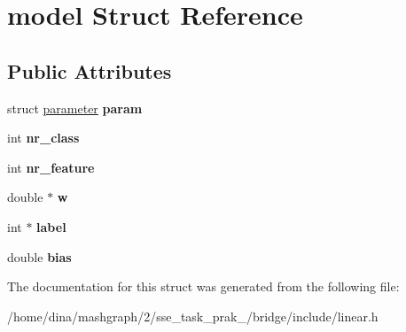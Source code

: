 \hypertarget{structmodel}{\section{model Struct Reference}
\label{structmodel}
}
\subsection*{Public Attributes}
\begin{DoxyCompactItemize}
\item 
\hypertarget{structmodel_a3ca6778799fcb1f51768582e3c0c31cd}{struct \hyperlink{structparameter}{parameter} {\bfseries param}}\label{structmodel_a3ca6778799fcb1f51768582e3c0c31cd}

\item 
\hypertarget{structmodel_a357cb97b0fc81dbbffe5e3f76841f58d}{int {\bfseries nr\-\_\-class}}\label{structmodel_a357cb97b0fc81dbbffe5e3f76841f58d}

\item 
\hypertarget{structmodel_ac2c7ba1085cded50033bbcccd31906a5}{int {\bfseries nr\-\_\-feature}}\label{structmodel_ac2c7ba1085cded50033bbcccd31906a5}

\item 
\hypertarget{structmodel_ad6895eef0c14414b0ddfb2551b23ab09}{double $\ast$ {\bfseries w}}\label{structmodel_ad6895eef0c14414b0ddfb2551b23ab09}

\item 
\hypertarget{structmodel_ab061d04d3f59b2af70e3442f1c7e3a14}{int $\ast$ {\bfseries label}}\label{structmodel_ab061d04d3f59b2af70e3442f1c7e3a14}

\item 
\hypertarget{structmodel_a9aef7cc709fca4e03a021623ce6c7ae6}{double {\bfseries bias}}\label{structmodel_a9aef7cc709fca4e03a021623ce6c7ae6}

\end{DoxyCompactItemize}


The documentation for this struct was generated from the following file\-:\begin{DoxyCompactItemize}
\item 
/home/dina/mashgraph/2/sse\-\_\-task\-\_\-prak\-\_/bridge/include/linear.\-h\end{DoxyCompactItemize}
